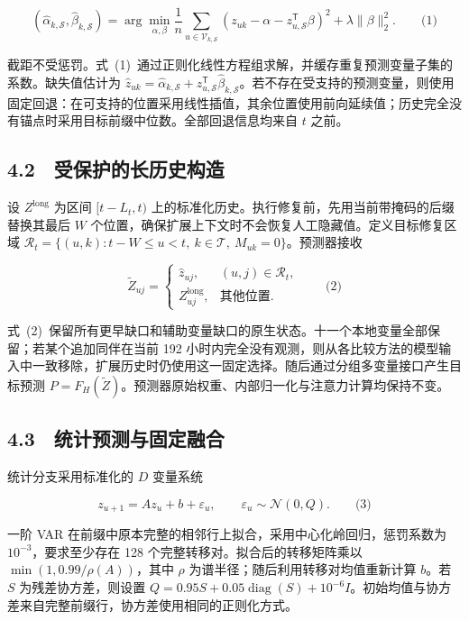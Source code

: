 \[(\widehat\alpha_{k,\mathcal S},\widehat\beta_{k,\mathcal S})
 =\arg\min_{\alpha,\beta}\frac1n\sum_{u\in\mathcal V_{k,\mathcal S}}
 (z_{uk}-\alpha-z_{u,\mathcal S}^{\mathsf T}\beta)^2
 +\lambda\|\beta\|_2^2.\qquad\text{(1)}\]


截距不受惩罚。式~(1)~通过正则化线性方程组求解，并缓存重复预测变量子集的系数。缺失值估计为 $\widehat z_{uk}=\widehat\alpha_{k,\mathcal S}+z_{u,\mathcal S}^{\mathsf T}\widehat\beta_{k,\mathcal S}$。若不存在受支持的预测变量，则使用固定回退：在可支持的位置采用线性插值，其余位置使用前向延续值；历史完全没有锚点时采用目标前缀中位数。全部回退信息均来自 $t$ 之前。

\subsection{4.2　受保护的长历史构造}

设 $Z^{\mathrm{long}}$ 为区间 $[t-L_t,t)$ 上的标准化历史。执行修复前，先用当前带掩码的后缀替换其最后 $W$ 个位置，确保扩展上下文时不会恢复人工隐藏值。定义目标修复区域 $\mathcal R_t=\{(u,k):t-W\leq u<t,\ k\in\mathcal T,\ M_{uk}=0\}$。预测器接收


\[\widetilde Z_{uj}=\begin{cases}
 \widehat z_{uj}, & (u,j)\in\mathcal R_t,\\
 Z^{\mathrm{long}}_{uj}, & \text{其他位置}.
 \end{cases}\qquad\text{(2)}\]


式~(2)~保留所有更早缺口和辅助变量缺口的原生状态。十一个本地变量全部保留；若某个追加同伴在当前 192 小时内完全没有观测，则从各比较方法的模型输入中一致移除，扩展历史时仍使用这一固定选择。随后通过分组多变量接口产生目标预测 $P=F_H(\widetilde Z)$。预测器原始权重、内部归一化与注意力计算均保持不变。

\subsection{4.3　统计预测与固定融合}

统计分支采用标准化的 $D$ 变量系统


\[z_{u+1}=Az_u+b+\varepsilon_u,\qquad \varepsilon_u\sim\mathcal N(0,Q).\qquad\text{(3)}\]


一阶 VAR 在前缀中原本完整的相邻行上拟合，采用中心化岭回归，惩罚系数为 $10^{-3}$，要求至少存在 128 个完整转移对。拟合后的转移矩阵乘以 $\min(1,0.99/\rho(A))$，其中 $\rho$ 为谱半径；随后利用转移对均值重新计算 $b$。若 $S$ 为残差协方差，则设置 $Q=0.95S+0.05\operatorname{diag}(S)+10^{-6}I$。初始均值与协方差来自完整前缀行，协方差使用相同的正则化方式。

